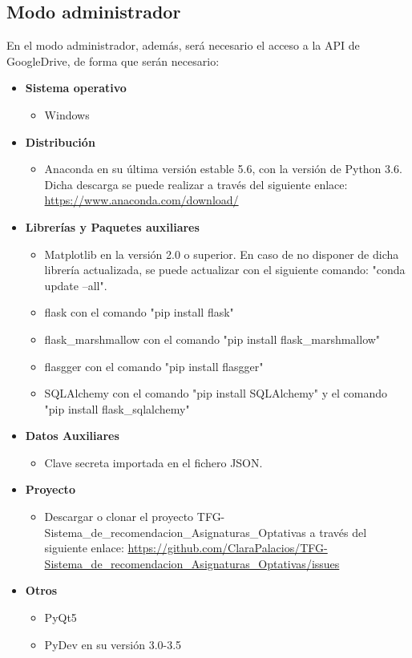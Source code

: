 \subsection{Modo administrador}
En el modo administrador, además, será necesario el acceso a la API de GoogleDrive, de forma que serán necesario: 
\begin{itemize}
\item \textbf{Sistema operativo}
\begin{itemize}
\item Windows
\end{itemize} 
\item \textbf{Distribución}
\begin{itemize}
\item Anaconda en su última versión estable 5.6, con la versión de Python 3.6. Dicha descarga se puede realizar a través del siguiente enlace: \url{https://www.anaconda.com/download/}
\end{itemize}
\item \textbf{Librerías y Paquetes auxiliares}
\begin{itemize}
\item Matplotlib en la versión 2.0 o superior.  En caso de no disponer de dicha librería actualizada, se puede actualizar con el siguiente comando: "conda update --all".
\item flask con el comando "pip install flask"
\item flask\_marshmallow con el comando "pip install flask\_marshmallow"
\item flasgger con el comando "pip install flasgger"
\item SQLAlchemy con el comando "pip install SQLAlchemy" y el comando "pip install flask\_sqlalchemy"
\end{itemize}
\item \textbf{Datos Auxiliares}
\begin{itemize}
\item Clave secreta importada en el fichero JSON. 
\end{itemize}
\item \textbf{Proyecto}
\begin{itemize}
\item Descargar o clonar el proyecto TFG-Sistema\_de\_recomendacion\_Asignaturas\_Optativas a través del siguiente enlace: \url{https://github.com/ClaraPalacios/TFG-Sistema_de_recomendacion_Asignaturas_Optativas/issues}
\end{itemize}
\item \textbf{Otros}
\begin{itemize}
\item PyQt5
\item PyDev en su versión 3.0-3.5
\end{itemize}
\end{itemize}

